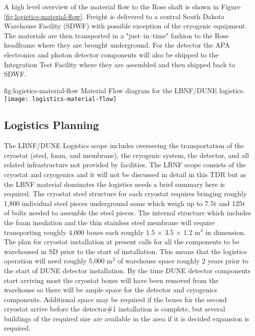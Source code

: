 A high level overview of the material flow to the Ross shaft is shown in Figure \ref{fig:logistics-material-flow}. Freight is delivered to a central South Dakota Warehouse Facility (SDWF) with possible exception of the cryogenic equipment. The materials are then transported in a "just--in--time" fashion to the Ross headframe where they are brought underground. For the detector the APA electronics and photon detector components will also be shipped to the Integration Test Facility where they are assembled and then shipped back to SDWF.
 
\begin{dunefigure}{fig:logistics-material-flow}
  {Material Flow diagram for the LBNF/DUNE logistics.}
 \texttt{[image: logistics-material-flow]}
\end{dunefigure}


\subsection{Logistics Planning}
\label{sec:fdsp-tc-logPln}
The LBNF/DUNE Logistics scope includes overseeing the transportation of the cryostat (steel, foam, and membrane), the cryogenic system, the detector, and all related infrastructure not provided by facilities. The LBNF scope consists of the cryostat and cryogenics and it will not be discussed in detail in this TDR but as the LBNF material dominates the logistics needs a brief summary here is required. The cryostat steel structure for each cryostat requires bringing roughly 1,800 individual steel pieces underground some which weigh up to 7.5t and 125t of bolts needed to assemble the steel pieces. The internal structure which includes the foam insulation and the thin stainless steel membrane will require transporting roughly 4,000 boxes each roughly 1.5 $\times$ 3.5 $\times$ 1.2 m$^3$ in dimension. The plan for cryostat installation at present calls for all the components to be warehoused in SD prior to the start of installation. This means that the logistics operation will need roughly 5,000 m$^2$ of warehouse space roughly 2 years prior to the start of DUNE detector installation. By the time DUNE detector components start arriving most the cryostat boxes will have been removed from the warehouse so there will be ample space for the detector and cryogenics components. Additional space may be required if the boxes for the second cryostat arrive before the detector\#1 installation is complete, but several buildings of the required size are available in the area if it is decided expansion is required.


